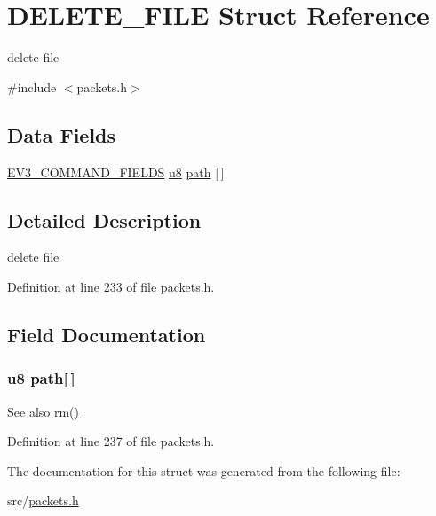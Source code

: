 \hypertarget{struct_d_e_l_e_t_e___f_i_l_e}{}\section{D\+E\+L\+E\+T\+E\+\_\+\+F\+I\+L\+E Struct Reference}
\label{struct_d_e_l_e_t_e___f_i_l_e}


delete file  




{\ttfamily \#include $<$packets.\+h$>$}

\subsection*{Data Fields}
\begin{DoxyCompactItemize}
\item 
\hyperlink{packets_8h_a0c26a010ef0da2962a751796943824c9}{E\+V3\+\_\+\+C\+O\+M\+M\+A\+N\+D\+\_\+\+F\+I\+E\+L\+D\+S} \hyperlink{defs_8h_a92c50087ca0e64fa93fc59402c55f8ca}{u8} \hyperlink{struct_d_e_l_e_t_e___f_i_l_e_a56e505ffa12d1226ba348960c4678d7f}{path} \mbox{[}$\,$\mbox{]}
\end{DoxyCompactItemize}


\subsection{Detailed Description}
delete file 

Definition at line 233 of file packets.\+h.



\subsection{Field Documentation}
\hypertarget{struct_d_e_l_e_t_e___f_i_l_e_a56e505ffa12d1226ba348960c4678d7f}{}
\subsubsection[{path}]{ {\bf u8} path\mbox{[}$\,$\mbox{]}}\label{struct_d_e_l_e_t_e___f_i_l_e_a56e505ffa12d1226ba348960c4678d7f}
\begin{DoxySeeAlso}{See also}
\hyperlink{funcs_8h_ae815743b20ac09451a0c027c8ad6b57e}{rm()} 
\end{DoxySeeAlso}


Definition at line 237 of file packets.\+h.



The documentation for this struct was generated from the following file\+:\begin{DoxyCompactItemize}
\item 
src/\hyperlink{packets_8h}{packets.\+h}\end{DoxyCompactItemize}
